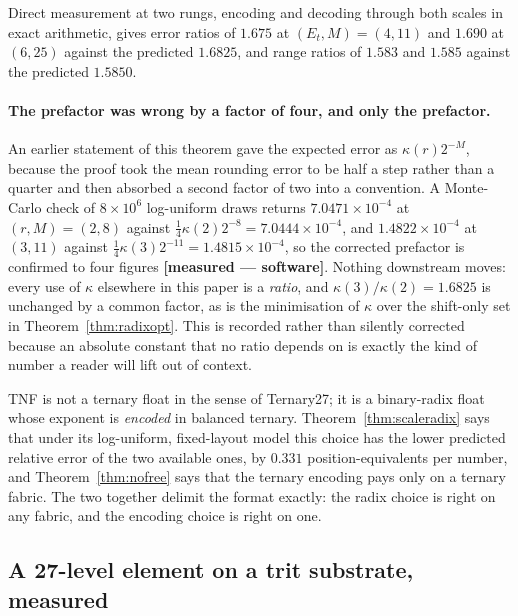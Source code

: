 Direct measurement at two rungs, encoding and decoding through both scales in
exact arithmetic, gives error ratios of $1.675$ at $(E_t,M) = (4,11)$ and $1.690$
at $(6,25)$ against the predicted $1.6825$, and range ratios of $1.583$ and
$1.585$ against the predicted $1.5850$.

\paragraph{The prefactor was wrong by a factor of four, and only the prefactor.}
An earlier statement of this theorem gave the expected error as $\kappa(r)2^{-M}$,
because the proof took the mean rounding error to be half a step rather than a
quarter and then absorbed a second factor of two into a convention. A Monte-Carlo
check of $8\times10^{6}$ log-uniform draws returns $7.0471\times10^{-4}$ at
$(r,M)=(2,8)$ against $\tfrac14\kappa(2)2^{-8} = 7.0444\times10^{-4}$, and
$1.4822\times10^{-4}$ at $(3,11)$ against $\tfrac14\kappa(3)2^{-11} =
1.4815\times10^{-4}$, so the corrected prefactor is confirmed to four figures
\textbf{[measured --- software]}. Nothing downstream moves: every use of $\kappa$
elsewhere in this paper is a \emph{ratio}, and $\kappa(3)/\kappa(2) = 1.6825$ is
unchanged by a common factor, as is the minimisation of $\kappa$ over the
shift-only set in Theorem~\ref{thm:radixopt}. This is recorded rather than
silently corrected because an absolute constant that no ratio depends on is
exactly the kind of number a reader will lift out of context.

\begin{corollary}
TNF is not a ternary float in the sense of Ternary27; it is a binary-radix float
whose exponent is \emph{encoded} in balanced ternary. Theorem~\ref{thm:scaleradix}
says that under its log-uniform, fixed-layout model this choice has the lower
predicted relative error of the two available ones, by $0.331$
position-equivalents per number, and Theorem~\ref{thm:nofree} says that the ternary encoding pays only on a
ternary fabric. The two together delimit the format exactly: the radix choice is
right on any fabric, and the encoding choice is right on one.
\end{corollary}



\subsection{A 27-level element on a trit substrate, measured}
\label{sec:t27block}

